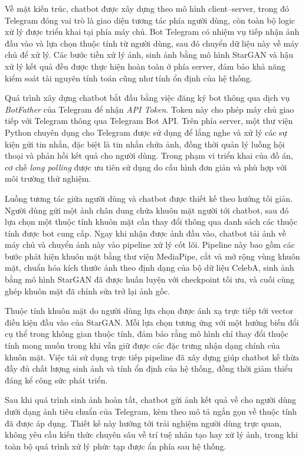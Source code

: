 \documentclass[../DoAn.tex]{subfiles}
\begin{document}
Về mặt kiến trúc, chatbot được xây dựng theo mô hình client--server, trong đó Telegram đóng vai trò là giao diện tương tác phía người dùng, còn toàn bộ logic xử lý được triển khai tại phía máy chủ. Bot Telegram có nhiệm vụ tiếp nhận ảnh đầu vào và lựa chọn thuộc tính từ người dùng, sau đó chuyển dữ liệu này về máy chủ để xử lý. Các bước tiền xử lý ảnh, sinh ảnh bằng mô hình StarGAN và hậu xử lý kết quả đều được thực hiện hoàn toàn ở phía server, đảm bảo khả năng kiểm soát tài nguyên tính toán cũng như tính ổn định của hệ thống.

Quá trình xây dựng chatbot bắt đầu bằng việc đăng ký bot thông qua dịch vụ \textit{BotFather} của Telegram để nhận \textit{API Token}. Token này cho phép máy chủ giao tiếp với Telegram thông qua Telegram Bot API. Trên phía server, một thư viện Python chuyên dụng cho Telegram được sử dụng để lắng nghe và xử lý các sự kiện gửi tin nhắn, đặc biệt là tin nhắn chứa ảnh, đồng thời quản lý luồng hội thoại và phản hồi kết quả cho người dùng. Trong phạm vi triển khai của đồ án, cơ chế \textit{long polling} được ưu tiên sử dụng do cấu hình đơn giản và phù hợp với môi trường thử nghiệm.

Luồng tương tác giữa người dùng và chatbot được thiết kế theo hướng tối giản. Người dùng gửi một ảnh chân dung chứa khuôn mặt người tới chatbot, sau đó lựa chọn một thuộc tính khuôn mặt cần thay đổi thông qua danh sách các thuộc tính được bot cung cấp. Ngay khi nhận được ảnh đầu vào, chatbot tải ảnh về máy chủ và chuyển ảnh này vào pipeline xử lý cốt lõi. Pipeline này bao gồm các bước phát hiện khuôn mặt bằng thư viện MediaPipe, cắt và mở rộng vùng khuôn mặt, chuẩn hóa kích thước ảnh theo định dạng của bộ dữ liệu CelebA, sinh ảnh bằng mô hình StarGAN đã được huấn luyện với checkpoint tối ưu, và cuối cùng ghép khuôn mặt đã chỉnh sửa trở lại ảnh gốc.

Thuộc tính khuôn mặt do người dùng lựa chọn được ánh xạ trực tiếp tới vector điều kiện đầu vào của StarGAN. Mỗi lựa chọn tương ứng với một hướng biến đổi cụ thể trong không gian thuộc tính, đảm bảo rằng mô hình chỉ thay đổi thuộc tính mong muốn trong khi vẫn giữ được các đặc trưng nhận dạng chính của khuôn mặt. Việc tái sử dụng trực tiếp pipeline đã xây dựng giúp chatbot kế thừa đầy đủ chất lượng sinh ảnh và tính ổn định của hệ thống, đồng thời giảm thiểu đáng kể công sức phát triển.

Sau khi quá trình sinh ảnh hoàn tất, chatbot gửi ảnh kết quả về cho người dùng dưới dạng ảnh tiêu chuẩn của Telegram, kèm theo mô tả ngắn gọn về thuộc tính đã được áp dụng. Thiết kế này hướng tới trải nghiệm người dùng trực quan, không yêu cầu kiến thức chuyên sâu về trí tuệ nhân tạo hay xử lý ảnh, trong khi toàn bộ quá trình xử lý phức tạp được ẩn phía sau hệ thống.
\end{document}
